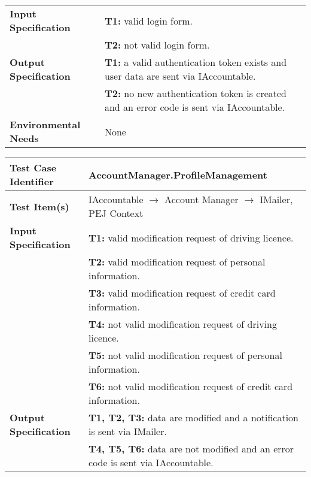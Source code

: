 {\begin{tabularx}{\textwidth}{l X}
    \textbf{Input Specification} & \textbf{T1:} valid login form.\\
                                &   \textbf{T2:} not valid login form.\\
    \hline 
    
    \textbf{Output Specification} & \textbf{T1:} a valid authentication token exists and user data are sent via IAccountable.\\
                                &   \textbf{T2:} no new authentication token is created and an error code is sent via IAccountable.\\
    \hline 
    
    \textbf{Environmental Needs} & None\\
    \hline
\end{tabularx}
\bigskip

\noindent
\begin{tabularx}{\textwidth}{l X}
    \hline 
    \textbf{Test Case Identifier} & AccountManager.ProfileManagement\\ 
    \hline 
    
    \textbf{Test Item(s)} & IAccountable $\rightarrow$ Account Manager $\rightarrow$ IMailer,  PEJ Context\\
    \hline 
    
    \textbf{Input Specification} &  \textbf{T1:} valid modification request of driving licence.\\
                                &\textbf{T2:} valid modification request of personal information.\\
                                &\textbf{T3:} valid modification request of credit card information.\\
                                &  \textbf{T4:} not valid modification request of driving licence.\\
                                &\textbf{T5:} not valid modification request of personal information.\\
                                &\textbf{T6:} not valid modification request of credit card information.\\
    \hline 
    
    \textbf{Output Specification} & \textbf{T1, T2, T3:} data are modified and a notification is sent via IMailer.\\
                                & \textbf{T4, T5, T6:} data are not modified and an error code is sent via IAccountable.\\
    \hline 
    

\end{tabularx}}
